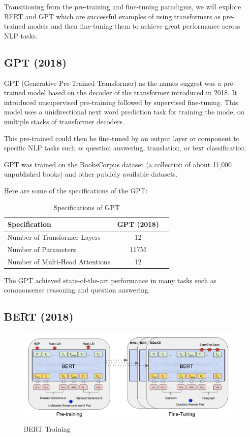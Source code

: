 \documentclass[11pt,twoside]{article}
\begin{document}
Transitioning from the pre-training and fine-tuning paradigms, we will explore BERT and GPT which are successful examples of using transformers as pre-trained models and then fine-tuning them to achieve great performance across NLP tasks.

\subsection{GPT (2018)}
GPT (Generative Pre-Trained Transformer) as the names suggest was a pre-trained model based on the decoder of the transformer introduced in 2018.  It introduced unsupervised pre-training followed by supervised fine-tuning. This model uses a unidirectional next word prediction task for training the model on multiple stacks of transformer decoders.

This pre-trained could then be fine-tuned by an output layer or component to specific NLP tasks such as question answering, translation, or text classification.

GPT was trained on the BooksCorpus dataset (a collection of about 11,000 unpublished books) and other publicly available datasets.

Here are some of the specifications of the GPT:

\begin{table}[H]
\centering
\renewcommand{\arraystretch}{1.5}
\setlength{\tabcolsep}{10pt}
\begin{tabular}{@{}lcc@{}}
\toprule
\textbf{Specification}          & \textbf{GPT (2018)}      \\ \midrule
Number of Transformer Layers    & 12                           \\
Number of Parameters            & 117M                         \\
Number of Multi-Head Attentions & 12                           \\ \bottomrule
\end{tabular}
\caption{Specifications of GPT }
\label{tab:gpt_specs}
\end{table}

The GPT achieved state-of-the-art performance in many tasks such as commonsense reasoning and question answering.


\subsection{BERT (2018)}

\begin{figure}[H]
    \centering
    \includegraphics[width=0.9\linewidth]{fig/BERt.png}
    \caption{BERT Training}
    \label{fig:enter-label}
\end{figure}
\end{document}
